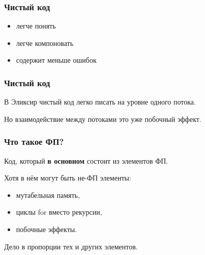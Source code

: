 \documentclass[10pt]{beamer}
\begin{document}
\begin{frame}
  \frametitle{Чистый код}
  \begin{itemize}
  \item легче понять
  \item легче компоновать
  \item содержит меньше ошибок
  \end{itemize}
\end{frame}

\begin{frame}
  \frametitle{Чистый код}
  В Эликсир чистый код легко писать на уровне одного потока.
  \par \bigskip
  Но взаимодействие между потоками это уже побочный эффект.
\end{frame}

\begin{frame}
  \frametitle{Что такое ФП?}
  Код, который \textbf{в основном} состоит из элементов ФП.
  \par \bigskip
  Хотя в нём могут быть не-ФП элементы:
  \begin{itemize}
  \item мутабельная память,
  \item циклы for вместо рекурсии,
  \item побочные эффекты.
  \end{itemize}
  \par \bigskip
  Дело в пропорции тех и других элементов.
\end{frame}
\end{document}
